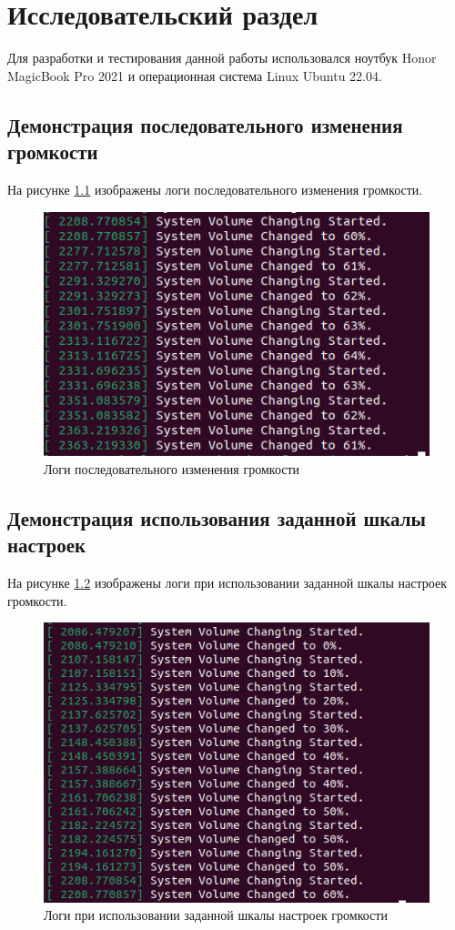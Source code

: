 \chapter{Исследовательский раздел}
\label{cha:research}

Для разработки и тестирования данной работы использовался ноутбук Honor MagicBook Pro 2021 и операционная система Linux Ubuntu 22.04. 

\section{Демонстрация последовательного изменения громкости}
На рисунке \ref{fig:module_steps} изображены логи последовательного изменения громкости.
\begin{figure}[h!btp]
	\centering
	\includegraphics[scale = 1.3]{inc/img/module_steps.png}
	\caption{Логи последовательного изменения громкости}
	\label{fig:module_steps}	
\end{figure}

\clearpage

\section{Демонстрация использования заданной шкалы настроек}
На рисунке \ref{fig:module_levels} изображены логи при использовании заданной шкалы настроек громкости.

\begin{figure}[h!btp]
	\centering
	\includegraphics[scale = 1.25]{inc/img/module_levels.png}
	\caption{Логи при использовании заданной шкалы настроек громкости}
	\label{fig:module_levels}	
\end{figure}